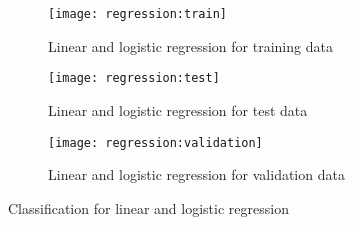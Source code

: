\documentclass[journal]{IEEEtran}
\newcommand\percentage[2][round-precision = 2]{%
    \SI[round-mode = places,
        scientific-notation = fixed, fixed-exponent = 0,
        output-decimal-marker={.}, #1]{#2e2}{\percent}%
}
\begin{document}


\begin{figure}[ht]
    \begin{subfigure}[b]{\linewidth}
        \texttt{[image: regression:train]}
        \caption{Linear and logistic regression for training data
        \label{fig:regression:train}}
    \end{subfigure}
    \begin{subfigure}[b]{\linewidth}
        \texttt{[image: regression:test]}
        \caption{Linear and logistic regression for test data
        \label{fig:regression:test}}
    \end{subfigure}
    \begin{subfigure}[b]{\linewidth}
        \texttt{[image: regression:validation]}
        \caption{Linear and logistic regression for validation data
        \label{fig:regression:validation}}
    \end{subfigure}
    \caption{Classification for linear and logistic regression
        \label{fig:regression}}
\end{figure}
\end{document}
